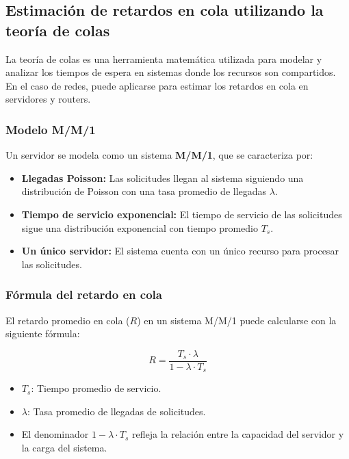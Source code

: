 \documentclass[a4paper,12pt]{article}
\begin{document}
\subsection{Estimación de retardos en cola utilizando la teoría de colas}

La teoría de colas es una herramienta matemática utilizada para modelar y analizar los tiempos de espera en sistemas donde los recursos son compartidos. En el caso de redes, puede aplicarse para estimar los retardos en cola en servidores y routers.

\subsubsection{Modelo M/M/1}

Un servidor se modela como un sistema \textbf{M/M/1}, que se caracteriza por:

\begin{itemize}
    \item \textbf{Llegadas Poisson:} Las solicitudes llegan al sistema siguiendo una distribución de Poisson con una tasa promedio de llegadas \(\lambda\).
    \item \textbf{Tiempo de servicio exponencial:} El tiempo de servicio de las solicitudes sigue una distribución exponencial con tiempo promedio \(T_s\).
    \item \textbf{Un único servidor:} El sistema cuenta con un único recurso para procesar las solicitudes.
\end{itemize}

\subsubsection{Fórmula del retardo en cola}

El retardo promedio en cola (\(R\)) en un sistema M/M/1 puede calcularse con la siguiente fórmula:

\[
R = \frac{T_s \cdot \lambda}{1 - \lambda \cdot T_s}
\]

\begin{itemize}
    \item \(T_s\): Tiempo promedio de servicio.
    \item \(\lambda\): Tasa promedio de llegadas de solicitudes.
    \item El denominador \(1 - \lambda \cdot T_s\) refleja la relación entre la capacidad del servidor y la carga del sistema.
\end{itemize}
\end{document}

